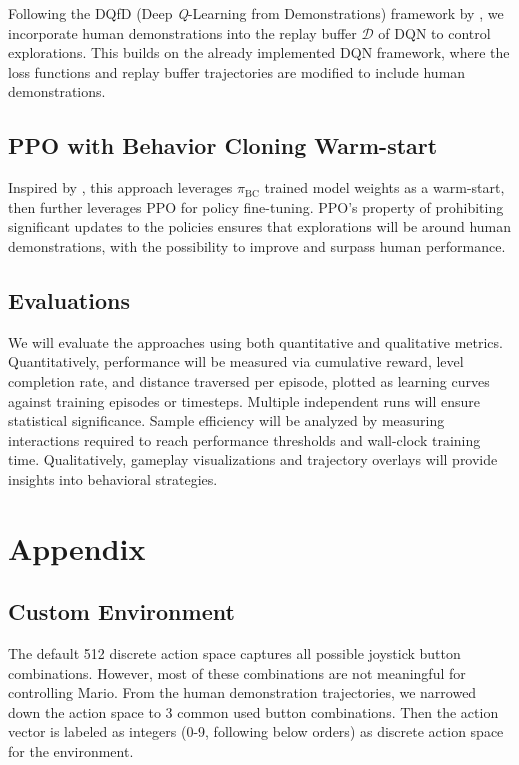 \documentclass{article}
\begin{document}
Following the DQfD (Deep \textit{Q}-Learning from Demonstrations) framework by 
\cite{hester_dqfd_2017}, we incorporate human demonstrations into the replay 
buffer $\mathcal{D}$ of DQN to control explorations. This builds on the already 
implemented DQN framework, where the loss functions and replay buffer 
trajectories are modified to include human demonstrations.

\subsection{PPO with Behavior Cloning Warm-start}

Inspired by \cite{Coletti2023EffectivenessOW}, this approach leverages 
$\pi_{\text{BC}}$ trained model weights as a warm-start, then further leverages 
PPO for policy fine-tuning. PPO's property of 
prohibiting significant updates to the policies ensures that explorations will 
be around human demonstrations, with the possibility to improve and surpass 
human performance.

\subsection{Evaluations}
We will evaluate the approaches using both quantitative and qualitative metrics. 
Quantitatively, performance will be measured via cumulative reward, level 
completion rate, and distance traversed per episode, plotted as learning curves 
against training episodes or timesteps. Multiple independent runs will ensure 
statistical significance. Sample efficiency will be analyzed by measuring 
interactions required to reach performance thresholds and wall-clock training 
time. Qualitatively, gameplay visualizations and trajectory overlays will 
provide insights into behavioral strategies.





\clearpage
\appendix
\renewcommand{\thefigure}{A\arabic{figure}}
\renewcommand{\thetable}{A\arabic{table}}
\setcounter{figure}{0}
\setcounter{table}{0}
\onecolumn
\section{Appendix}
\subsection{Custom Environment}
\label{a1:custom_env}

The default 512 discrete action space captures all possible joystick button 
combinations. However, most of these combinations are not meaningful for 
controlling Mario. From the human demonstration trajectories, we narrowed down 
the action space to 3 common used button combinations.
Then the action vector is labeled as integers (0-9, following below orders)
as discrete action space for the environment.
\end{document}
